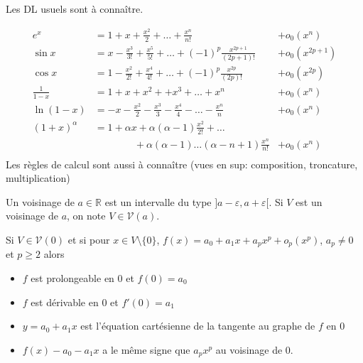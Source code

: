 \begin{rem}
    Les DL usuels sont à connaître.

\begin{align*}
    e^x &= 1 + x + \frac{x^2}{2} +\ldots+ \frac{x^n}{n!} &+ o_0(x^n) \\
    \sin x &= x - \frac{x^3}{3!}+\frac{x^5}{5!} +\ldots+(-1)^p\frac{x^{2p+1}}{(2p+1)!}
           & +o_0(x^{2p+1} ) \\
    \cos x &= 1 - \frac{x^2}{2!}+\frac{x^4}{4!} +\ldots+(-1)^p\frac{x^{2p}}{(2p)!}
           & +o_0(x^{2p}) \\
    \frac{1}{1-x} &= 1 + x + x^2 + + x^3 + \ldots + x^n
        & + o_0(x^n) \\
    \ln (1-x) &= -x - \frac{x^2}{2} - \frac{x^3}{3} - \frac{x^4}{4} - \ldots - \frac{x^n}{n}
        & + o_0(x^n) \\
    (1+x)^\alpha &= 1 + \alpha x + \alpha (\alpha-1) \frac{x^2}{2!} + \ldots \\
        & \qquad\qquad +\alpha(\alpha-1)\ldots(\alpha-n+1)\frac{x^n}{n!}
        & + o_0(x^n) \\
\end{align*}
Les règles de calcul sont aussi à connaître (vues en sup: composition, troncature, multiplication)
\end{rem}

\begin{dfn}
    Un voisinage de $a\in\mathbb R$ est un intervalle du type $]a-\varepsilon, a+\varepsilon[$. Si $V$ est un voisinage de $a$, on note $V\in\mathcal V(a)$.
\end{dfn}

Si $V\in\mathcal V(0)$ et si pour $x\in V\setminus\{0\}$, $f(x)=a_0+a_1x +a_px^p+o_p(x^p)$, $a_p\neq 0$ et $p\geq 2$ alors \begin{itemize}
    \item $f$ est prolongeable en $0$ et $f(0)=a_0$
    \item $f$ est dérivable en $0$ et $f'(0)=a_1$
    \item $y=a_0+a_1x$ est l'équation cartésienne de la tangente au graphe de $f$ en $0$
    \item $f(x)-a_0-a_1x$ a le même signe que $a_px^p$ au voisinage de $0$.
\end{itemize}

